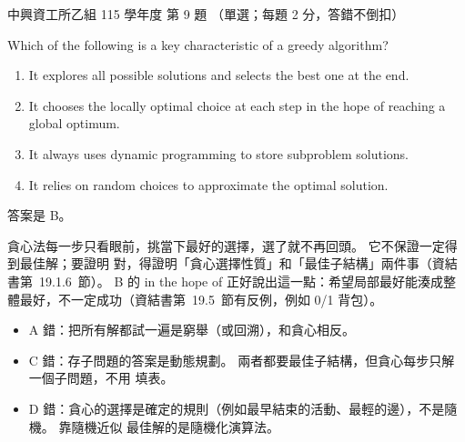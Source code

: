 \begin{pastexam}[label={px:nchu-115-is-09}]{中興資工所乙組 115 學年度 第 9 題}
（單選；每題 2 分，答錯不倒扣）

Which of the following is a key characteristic of a greedy algorithm?
\begin{enumerate}[label=\Alph*.,nosep]
\item It explores all possible solutions and selects the best one at the end.
\item It chooses the locally optimal choice at each step in the hope of reaching a global optimum.
\item It always uses dynamic programming to store subproblem solutions.
\item It relies on random choices to approximate the optimal solution.
\end{enumerate}
\end{pastexam}

\begin{pastsoln}
答案是 B。

貪心法每一步只看眼前，挑當下最好的選擇，選了就不再回頭。 它不保證一定得到最佳解；要證明
對，得證明「貪心選擇性質」和「最佳子結構」兩件事（資結書第~19.1.6~節）。 B 的 in the hope
of 正好說出這一點：希望局部最好能湊成整體最好，不一定成功（資結書第~19.5~節有反例，例如
0/1 背包）。
\begin{itemize}
\item A 錯：把所有解都試一遍是窮舉（或回溯），和貪心相反。
\item C 錯：存子問題的答案是動態規劃。 兩者都要最佳子結構，但貪心每步只解一個子問題，不用
填表。
\item D 錯：貪心的選擇是確定的規則（例如最早結束的活動、最輕的邊），不是隨機。 靠隨機近似
最佳解的是隨機化演算法。
\end{itemize}
\end{pastsoln}
